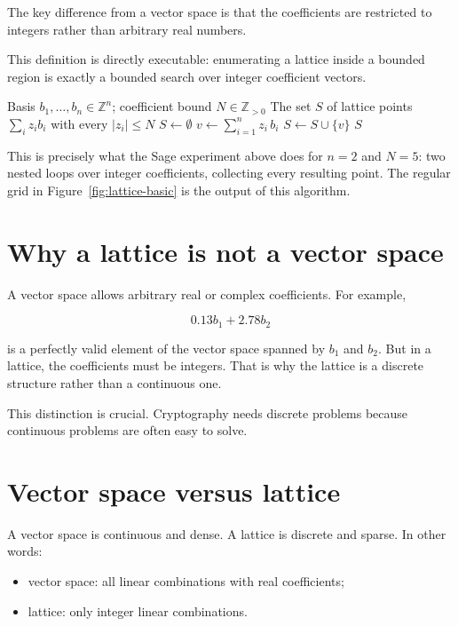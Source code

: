 The key difference from a vector space is that the coefficients are restricted to integers rather than arbitrary real numbers.

This definition is directly executable: enumerating a lattice inside a bounded region is exactly a bounded search over integer coefficient vectors.

\begin{algorithm}[H]
\caption{Bounded Lattice-Point Enumeration}
\label{alg:lattice-enum}
\begin{algorithmic}[1]
\Require Basis $b_1,\dots,b_n \in \mathbb{Z}^n$; coefficient bound $N \in \mathbb{Z}_{>0}$
\Ensure The set $S$ of lattice points $\sum_i z_i b_i$ with every $|z_i| \le N$
\State $S \gets \emptyset$
    \State $v \gets \sum_{i=1}^{n} z_i \, b_i$
    \State $S \gets S \cup \{v\}$
\EndFor
\State \Return $S$
\end{algorithmic}
\end{algorithm}

This is precisely what the Sage experiment above does for $n=2$ and $N=5$: two nested loops over integer coefficients, collecting every resulting point. The regular grid in Figure~\ref{fig:lattice-basic} is the output of this algorithm.

\section{Why a lattice is not a vector space}
A vector space allows arbitrary real or complex coefficients. For example,

\[
0.13 b_1 + 2.78 b_2
\]

is a perfectly valid element of the vector space spanned by $b_1$ and $b_2$. But in a lattice, the coefficients must be integers. That is why the lattice is a discrete structure rather than a continuous one.

This distinction is crucial. Cryptography needs discrete problems because continuous problems are often easy to solve.

\section{Vector space versus lattice}
A vector space is continuous and dense. A lattice is discrete and sparse. In other words:

\begin{itemize}
  \item vector space: all linear combinations with real coefficients;
  \item lattice: only integer linear combinations.
\end{itemize}

